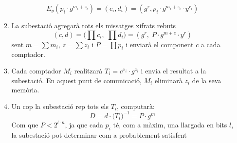 \begin{enumerate}
\begin{enumerate}
		\[E_y(p_i \cdot g^{m_i + z_i}) = (c_i, d_i) = (g^r, p_i \cdot g^{m_i + z_i} \cdot y^{r_i})\]
		\item La subestació agregarà tots els missatges xifrats rebuts
		\[(c, d) = \Big( \prod c_i, \; \prod d_i \Big) = (g^r,\; P \cdot g^{m + z} \cdot y^r)\]
		sent $m = \sum m_i$, $z = \sum z_i$ i $P = \prod p_i$ i enviarà el component $c$ a cada comptador.
		\item Cada comptador $M_i$ realitzarà $T_i = c^{x_i} \cdot g^{z_i}$ i envia el resultat a la subestació. En aquest punt de comunicació, $M_i$ eliminarà $z_i$ de la seva memòria.
		\item Un cop la subestació rep tots els $T_i$, computarà:
		\[D = d \cdot \Big( T_i \Big)^{-1} = P \cdot g^m\]
		Com que $P < 2^{l \cdot n}$, ja que cada $p_i$ té, com a màxim, una llargada en bits $l$, la subestació pot determinar com a probablement satisfent 
	\end{enumerate}
\end{enumerate}


